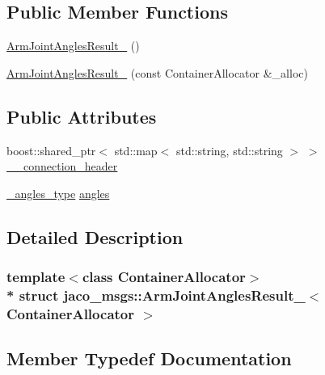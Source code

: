 \subsection*{Public Member Functions}
\begin{DoxyCompactItemize}
\item 
\hyperlink{structjaco__msgs_1_1ArmJointAnglesResult___ae1fe811f0a4c2b8eaa0e0ef65076b26b}{Arm\+Joint\+Angles\+Result\+\_\+} ()
\item 
\hyperlink{structjaco__msgs_1_1ArmJointAnglesResult___ada955fecf2e1269ccb8af03ad8d9f650}{Arm\+Joint\+Angles\+Result\+\_\+} (const Container\+Allocator \&\+\_\+alloc)
\end{DoxyCompactItemize}
\subsection*{Public Attributes}
\begin{DoxyCompactItemize}
\item 
boost\+::shared\+\_\+ptr$<$ std\+::map$<$ std\+::string, std\+::string $>$ $>$ \hyperlink{structjaco__msgs_1_1ArmJointAnglesResult___a914c7cee68d44c0d1b4d8f61e13a5a42}{\+\_\+\+\_\+connection\+\_\+header}
\item 
\hyperlink{structjaco__msgs_1_1ArmJointAnglesResult___a555b513327e037ed98d9cb6934f77955}{\+\_\+angles\+\_\+type} \hyperlink{structjaco__msgs_1_1ArmJointAnglesResult___a5b6fe64a0d822194474af38863a9f8a2}{angles}
\end{DoxyCompactItemize}


\subsection{Detailed Description}
\subsubsection*{template$<$class Container\+Allocator$>$\\*
struct jaco\+\_\+msgs\+::\+Arm\+Joint\+Angles\+Result\+\_\+$<$ Container\+Allocator $>$}



\subsection{Member Typedef Documentation}
